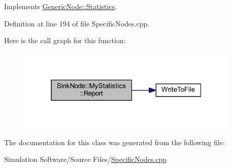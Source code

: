 Implements \hyperlink{class_generic_node_1_1_statistics_ada017fd13bc1b6704d6c7d15ba9ed8df}{Generic\+Node\+::\+Statistics}.



Definition at line 194 of file Specific\+Nodes.\+cpp.

Here is the call graph for this function\+:\nopagebreak
\begin{figure}[H]
\begin{center}
\leavevmode
\includegraphics[width=301pt]{class_sink_node_1_1_my_statistics_acd304ae3a9892c9de454dc7ee36a942b_cgraph}
\end{center}
\end{figure}


The documentation for this class was generated from the following file\+:\begin{DoxyCompactItemize}
\item 
Simulation Software/\+Source Files/\hyperlink{_specific_nodes_8cpp}{Specific\+Nodes.\+cpp}\end{DoxyCompactItemize}
